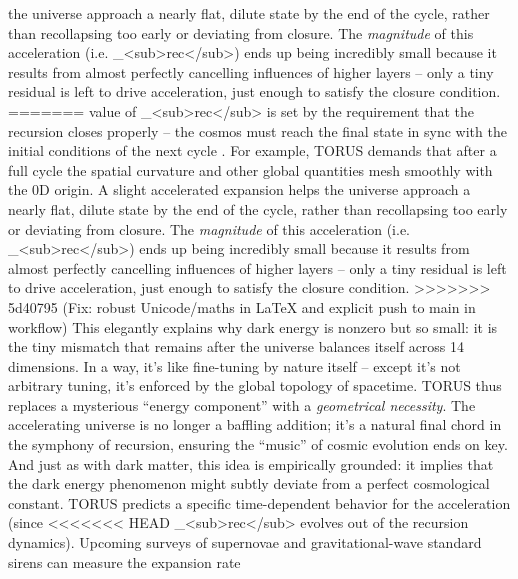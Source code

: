 \documentclass[]{article}
\begin{document}
the universe approach a nearly flat, dilute state by the end of the
cycle, rather than recollapsing too early or deviating from
closure\hspace{0pt}. The \emph{magnitude} of this acceleration (i.e.
\Lambda\_\textless sub\textgreater rec\textless/sub\textgreater) ends up being
incredibly small because it results from almost perfectly cancelling
influences of higher layers -- only a tiny residual is left to drive
acceleration, just enough to satisfy the closure condition\hspace{0pt}.
=======
value of \Lambda\_\textless{}sub\textgreater{}rec\textless{}/sub\textgreater{}
is set by the requirement that the recursion closes properly -- the
cosmos must reach the final state in sync with the initial conditions of
the next cycle​ ​. For example, TORUS demands that after a full cycle
the spatial curvature and other global quantities mesh smoothly with the
0D origin. A slight accelerated expansion helps the universe approach a
nearly flat, dilute state by the end of the cycle, rather than
recollapsing too early or deviating from closure​. The \emph{magnitude}
of this acceleration (i.e.
\Lambda\_\textless{}sub\textgreater{}rec\textless{}/sub\textgreater{}) ends up
being incredibly small because it results from almost perfectly
cancelling influences of higher layers -- only a tiny residual is left
to drive acceleration, just enough to satisfy the closure condition​.
>>>>>>> 5d40795 (Fix: robust Unicode/maths in LaTeX and explicit push to main in workflow)
This elegantly explains why dark energy is nonzero but so small: it is
the tiny mismatch that remains after the universe balances itself across
14 dimensions. In a way, it's like fine-tuning by nature itself --
except it's not arbitrary tuning, it's enforced by the global topology
of spacetime. TORUS thus replaces a mysterious ``energy component'' with
a \emph{geometrical necessity}. The accelerating universe is no longer a
baffling addition; it's a natural final chord in the symphony of
recursion, ensuring the ``music'' of cosmic evolution ends on key. And
just as with dark matter, this idea is empirically grounded: it implies
that the dark energy phenomenon might subtly deviate from a perfect
cosmological constant. TORUS predicts a specific time-dependent behavior
for the acceleration (since
<<<<<<< HEAD
\Lambda\_\textless sub\textgreater rec\textless/sub\textgreater{} evolves out
of the recursion dynamics)\hspace{0pt}. Upcoming surveys of supernovae
and gravitational-wave standard sirens can measure the expansion rate
\end{document}
